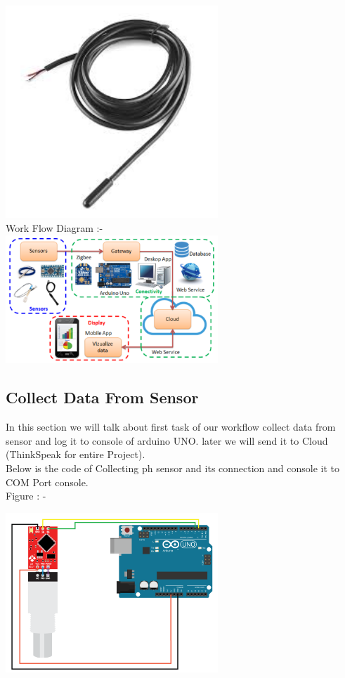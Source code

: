 \includegraphics[width=0.6\textwidth]{images/temp sensor.jpeg}
\\

Work Flow Diagram :- \\

\includegraphics[width=0.6\textwidth]{images/workflow.png}\\



\subsection{Collect Data From Sensor}

In this section we will talk about first task of our workflow collect data from sensor and log it to console of arduino UNO. later we will send it to Cloud (ThinkSpeak for entire Project).\\

Below is the code of Collecting ph sensor and its connection and console it to COM Port console.\\

Figure : - 

\includegraphics[width=0.6\textwidth]{images/ph-probe-calibration-wiring-diagram_YLRPvVdUwm.png}\\


